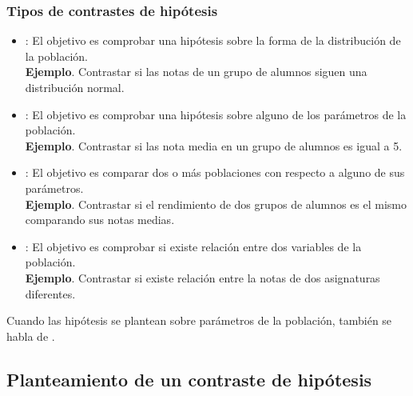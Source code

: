 \begin{frame}
\frametitle{Tipos de contrastes de hipótesis}
\begin{itemize}[<+->]
\item {}: El objetivo es comprobar una hipótesis sobre la forma de la
distribución de la población.\\
\textbf{Ejemplo}. Contrastar si las notas de un grupo de alumnos siguen una distribución normal.
\item {}: El objetivo es comprobar una hipótesis sobre alguno de los parámetros
de la población.\\
\textbf{Ejemplo}. Contrastar si las nota media en un grupo de alumnos es igual a 5.
\item {}: El objetivo es comparar dos o más poblaciones con respecto a alguno de sus
parámetros.\\
\textbf{Ejemplo}. Contrastar si el rendimiento de dos grupos de alumnos es el mismo comparando sus notas medias.
\item {}: El objetivo es comprobar si existe relación entre dos
variables de la población.\\
\textbf{Ejemplo}. Contrastar si existe relación entre la notas de dos asignaturas diferentes.
\end{itemize}

\pause
Cuando las hipótesis se plantean sobre parámetros de la población, también se habla de .
\end{frame}


\subsection{Planteamiento de un contraste de hipótesis}


